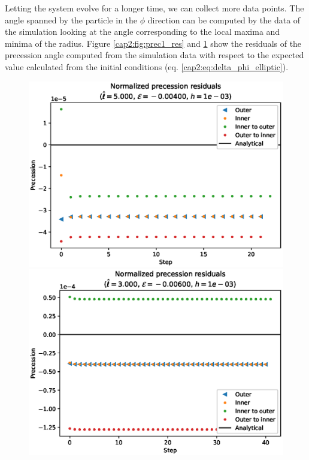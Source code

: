 Letting the system evolve for a longer time, we can collect more data points.
The angle spanned by the particle in the $\phi$ direction can be computed by
the data of the simulation looking at the angle corresponding to the local
maxima and minima of the radius.
Figure \ref{cap2:fig:prec1_res} and \ref{cap2:fig:prec2_res} show the residuals
of the precession angle computed from the simulation data with respect to the
expected value calculated from the initial conditions
(eq. \ref{cap2:eq:delta_phi_elliptic}).

\begin{figure}[h]
    \begin{minipage}{0.48 \textwidth}
        \centering
        \includegraphics[width=\textwidth]{Figures/chapter2/prec1_res.eps}
        \caption{}
        \label{cap2:fig:prec1_res}
    \end{minipage}
    \hspace{0.015 \textwidth}
    \begin{minipage}{0.48 \textwidth}
        \centering
        \includegraphics[width=\textwidth]{Figures/chapter2/prec2_res.eps}
        \caption{}
        \label{cap2:fig:prec2_res}
    \end{minipage}
\end{figure}

